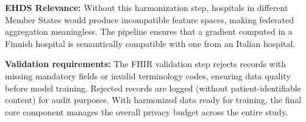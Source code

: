 \documentclass[conference]{IEEEtran}
\begin{document}
\textbf{EHDS Relevance:} Without this harmonization step, hospitals in different Member States would produce incompatible feature spaces, making federated aggregation meaningless. The pipeline ensures that a gradient computed in a Finnish hospital is semantically compatible with one from an Italian hospital.

\begin{figure}[htbp]
\centering
{}
\end{figure}

\textbf{Validation requirements:} The FHIR validation step rejects records with missing mandatory fields or invalid terminology codes, ensuring data quality before model training. Rejected records are logged (without patient-identifiable content) for audit purposes. With harmonized data ready for training, the final core component manages the overall privacy budget across the entire study.
\end{document}
